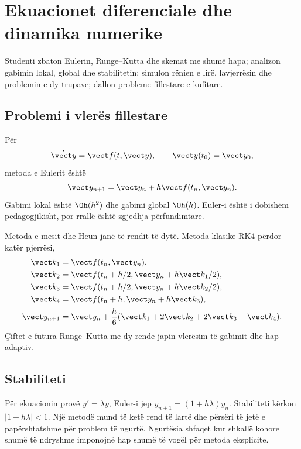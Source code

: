 \chapter{Ekuacionet diferenciale dhe dinamika numerike}
\begin{qellime}
Studenti zbaton Eulerin, Runge--Kutta dhe skemat me shumë hapa; analizon gabimin lokal, global dhe stabilitetin; simulon rënien e lirë, lavjerrësin dhe problemin e dy trupave; dallon probleme fillestare e kufitare.
\end{qellime}

\section{Problemi i vlerës fillestare}
Për
\begin{equation}
 \dot{\vect y}=\vect f(t,\vect y),\qquad \vect y(t_0)=\vect y_0,
\end{equation}
metoda e Eulerit është
\begin{equation}
 \vect y_{n+1}=\vect y_n+h\vect f(t_n,\vect y_n).
\end{equation}
Gabimi lokal është $\Oh(h^2)$ dhe gabimi global $\Oh(h)$. Euler-i është i dobishëm pedagogjikisht, por rrallë është zgjedhja përfundimtare.

Metoda e mesit dhe Heun janë të rendit të dytë. Metoda klasike RK4 përdor katër pjerrësi,
\begin{align}
 \vect k_1&=\vect f(t_n,\vect y_n),\\
 \vect k_2&=\vect f(t_n+h/2,\vect y_n+h\vect k_1/2),\\
 \vect k_3&=\vect f(t_n+h/2,\vect y_n+h\vect k_2/2),\\
 \vect k_4&=\vect f(t_n+h,\vect y_n+h\vect k_3),\\
 \vect y_{n+1}&=\vect y_n+\frac h6(\vect k_1+2\vect k_2+2\vect k_3+\vect k_4).
\end{align}
Çiftet e futura Runge--Kutta me dy rende japin vlerësim të gabimit dhe hap adaptiv.

\section{Stabiliteti}
Për ekuacionin provë $y'=\lambda y$, Euler-i jep $y_{n+1}=(1+h\lambda)y_n$. Stabiliteti kërkon $|1+h\lambda|<1$. Një metodë mund të ketë rend të lartë dhe përsëri të jetë e papërshtatshme për problem të ngurtë. Ngurtësia shfaqet kur shkallë kohore shumë të ndryshme imponojnë hap shumë të vogël për metoda eksplicite.

